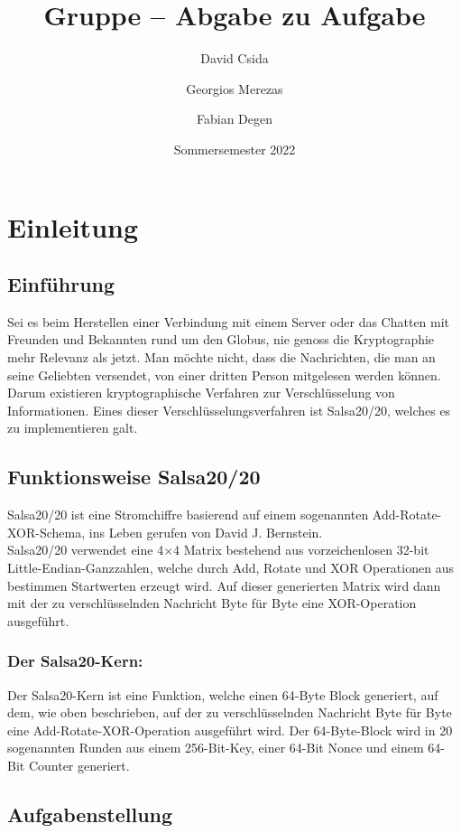 \documentclass[course=erap]{aspdoc}
\author{David Csida \and Georgios Merezas \and Fabian Degen}
\date{Sommersemester 2022} %
\title{Gruppe \theGroup{} -- Abgabe zu Aufgabe \theNumber}
\begin{document}
\maketitle

\section{Einleitung}
\subsection{Einführung}
Sei es beim Herstellen einer Verbindung mit einem Server oder das Chatten mit Freunden und Bekannten rund um 
den Globus, nie genoss die Kryptographie mehr Relevanz als jetzt. Man möchte nicht, dass die Nachrichten, 
die man an seine Geliebten versendet, von einer dritten Person mitgelesen werden können. Darum existieren 
kryptographische Verfahren zur Verschlüsselung von Informationen. Eines dieser Verschlüsselungsverfahren ist 
Salsa20/20, welches es zu implementieren galt.

\subsection{Funktionsweise Salsa20/20}
Salsa20/20 ist eine Stromchiffre basierend auf einem sogenannten Add-Rotate-XOR-Schema, ins Leben gerufen von 
David J. Bernstein.
\\Salsa20/20 verwendet eine 4$\times$4 Matrix bestehend aus vorzeichenlosen 32-bit Little-Endian-Ganzzahlen, 
welche durch Add, Rotate und XOR Operationen aus bestimmen Startwerten erzeugt wird.
Auf dieser generierten Matrix wird dann mit der zu verschlüsselnden Nachricht Byte für Byte eine XOR-Operation ausgeführt.

\subsubsection{Der Salsa20-Kern:}
Der Salsa20-Kern ist eine Funktion, welche einen 64-Byte Block generiert, auf dem, wie oben beschrieben, auf 
der zu verschlüsselnden Nachricht Byte für Byte eine Add-Rotate-XOR-Operation ausgeführt wird. Der 64-Byte-Block wird in 20 
sogenannten Runden aus einem 256-Bit-Key, einer 64-Bit Nonce und einem 64-Bit Counter generiert.

\subsection{Aufgabenstellung}
\end{document}
